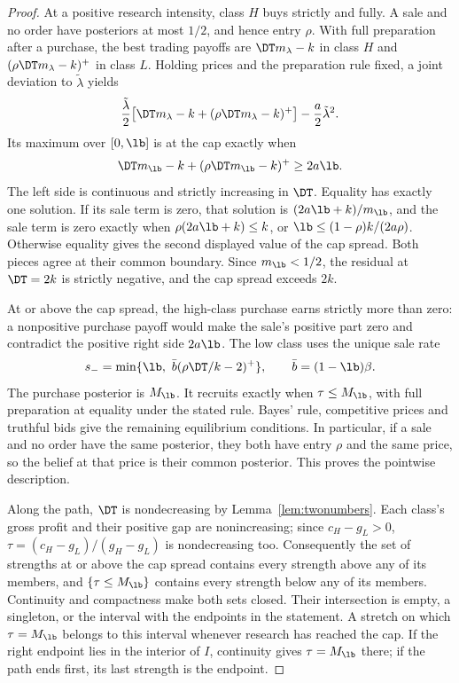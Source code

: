 \begin{proof}
At a positive research intensity, class \(H\) buys strictly and fully. A sale and no order have posteriors at most
\(1/2\), and hence entry \(\rho\). With full preparation after a purchase, the best trading payoffs are
\(\DT m_\lambda-k\) in class \(H\) and \((\rho\DT m_\lambda-k)^+\) in class \(L\). Holding prices and the
preparation rule fixed, a joint deviation to \(\tilde\lambda\) yields
\[
\frac{\tilde\lambda}{2}
 \bigl[\DT m_\lambda-k+(\rho\DT m_\lambda-k)^+\bigr]
 -\frac a2\tilde\lambda^2.
\]
Its maximum over \([0,\lb]\) is at the cap exactly when
\[
\DT m_{\lb}-k+(\rho\DT m_{\lb}-k)^+\ge2a\lb.
\]
The left side is continuous and strictly increasing in \(\DT\). Equality has exactly one solution. If its sale
term is zero, that solution is \((2a\lb+k)/m_{\lb}\), and the sale term is zero exactly when
\(\rho(2a\lb+k)\le k\), or \(\lb\le(1-\rho)k/(2a\rho)\). Otherwise equality gives the second displayed value
of the cap spread. Both pieces agree at their common boundary. Since \(m_{\lb}<1/2\), the residual at
\(\DT=2k\) is strictly negative, and the cap spread exceeds \(2k\).

At or above the cap spread, the high-class purchase earns strictly more than zero: a nonpositive purchase payoff
would make the sale's positive part zero and contradict the positive right side \(2a\lb\). The low class uses
the unique sale rate
\[
 s_-=\min\{\lb,\ \bar b(\rho\DT/k-2)^+\},\qquad \bar b=(1-\lb)\beta.
\]
The purchase posterior is \(M_{\lb}\). It recruits exactly when \(\tau\le M_{\lb}\), with full preparation at
equality under the stated rule. Bayes' rule, competitive prices and truthful bids give the remaining equilibrium
conditions. In particular, if a sale and no order have the same posterior, they both have entry \(\rho\) and the
same price, so the belief at that price is their common posterior. This proves the pointwise description.

Along the path, \(\DT\) is nondecreasing by Lemma~\ref{lem:twonumbers}.
Each class's gross profit and their positive gap are nonincreasing;
since \(c_H-g_L>0\), \(\tau=(c_H-g_L)/(g_H-g_L)\) is nondecreasing too. Consequently
the set of strengths at or above the cap spread contains every strength above any of its members, and
\(\{\tau\le M_{\lb}\}\) contains every strength below any of its members. Continuity and compactness make
both sets closed. Their intersection is empty, a singleton, or the interval with the endpoints in the statement.
A stretch on which \(\tau=M_{\lb}\) belongs to this interval whenever research has reached the cap. If the right
endpoint lies in the interior of \(I\), continuity gives \(\tau=M_{\lb}\) there; if the path ends first, its
last strength is the endpoint.
\end{proof}

